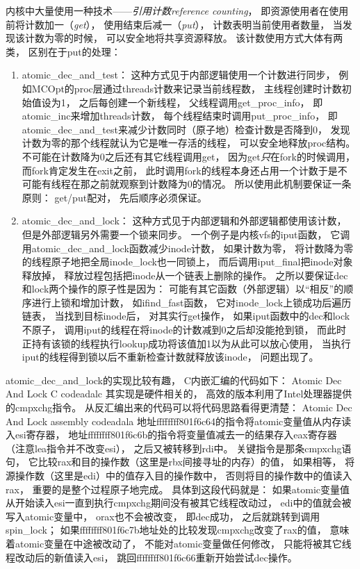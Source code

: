 内核中大量使用一种技术——{\em 引用计数}{\em reference counting}，
即资源使用者在使用前将计数加一（{\em get}），
使用结束后减一（{\em put}），
计数表明当前使用者数量，
当发现该计数为零的时候，
可以安全地将共享资源释放。
该计数使用方式大体有两类，
区别在于put的处理：
\begin{enumerate}
  \item {atomic\_dec\_and\_test}：
    这种方式见于内部逻辑使用一个计数进行同步，
    例如MCOpt的proc层通过threads计数来记录当前线程数，
    主线程创建时计数初始值设为1，
    之后每创建一个新线程，
    父线程调用get\_proc\_info，
    即atomic\_inc来增加threads计数，
    每个线程结束时调用put\_proc\_info，
    即atomic\_dec\_and\_test来减少计数同时（原子地）检查计数是否降到0，
    发现计数为零的那个线程就认为它是唯一存活的线程，
    可以安全地释放proc结构。
    不可能在计数降为0之后还有其它线程调用get，
    因为get{\em 只}在fork的时候调用，
    而fork肯定发生在exit之前，
    此时调用fork的线程本身还占用一个计数于是不可能有线程在那之前就观察到计数降为0的情况。
    所以使用此机制要保证一条原则：
    get/put配对，
    先后顺序必须保证。

  \item {atomic\_dec\_and\_lock}：
    这种方式见于内部逻辑和外部逻辑都使用该计数，
    但是外部逻辑另外需要一个锁来同步。
    一个例子是内核vfs的iput函数，
    它调用atomic\_dec\_and\_lock函数减少inode计数，
    如果计数为零，
    将计数降为零的线程原子地把全局inode\_lock也一同锁上，
    而后调用iput\_final把inode对象释放掉，
    释放过程包括把inode从一个链表上删除的操作。
    之所以要保证dec和lock两个操作的原子性是因为：
    可能有其它函数（外部逻辑）以``相反''的顺序进行上锁和增加计数，
    如ifind\_fast函数，
    它对inode\_lock上锁成功后遍历链表，
    当找到目标inode后，
    对其实行get操作，
    如果iput函数中的dec和lock不原子，
    调用iput的线程在将inode的计数减到0之后却没能抢到锁，
    而此时正持有该锁的线程执行lookup成功将该值加1以为从此可以放心使用，
    当执行iput的线程得到锁以后不重新检查计数就释放该inode，
    问题出现了。
\end{enumerate}
atomic\_dec\_and\_lock的实现比较有趣，
C内嵌汇编的代码如下：
              {Atomic Dec And Lock C code}{adalc}
其实现是硬件相关的，
高效的版本利用了Intel处理器提供的cmpxchg指令。
从反汇编出来的代码可以将代码思路看得更清楚：
                {Atomic Dec And Lock assembly code}{adala}
地址ffffffff801f6c64的指令将atomic变量值从内存读入esi寄存器，
地址ffffffff801f6c6b的指令将变量值减去一的结果存入eax寄存器%
（注意lea指令并不改变esi），
之后又被转移到rdi中。
关键指令是那条cmpxchg语句，
它比较rax和目的操作数（这里是rbx间接寻址的内存）的值，
如果相等，
将源操作数（这里是edi）中的值存入目的操作数中，
否则将目的操作数中的值读入rax，
重要的是整个过程原子地完成。
具体到这段代码就是：
如果atomic变量值从开始读入esi一直到执行cmpxchg期间没有被其它线程改动过，
edi中的值就会被写入atomic变量中，
orax也不会被改变，
即dec成功，
之后就跳转到调用spin\_lock；
如果ffffffff801f6c7b地址处的比较发现cmpxchg改变了rax的值，
意味着atomic变量在中途被改动了，
不能对atomic变量做任何修改，
只能将被其它线程改动后的新值读入esi，
跳回ffffffff801f6c66重新开始尝试dec操作。
